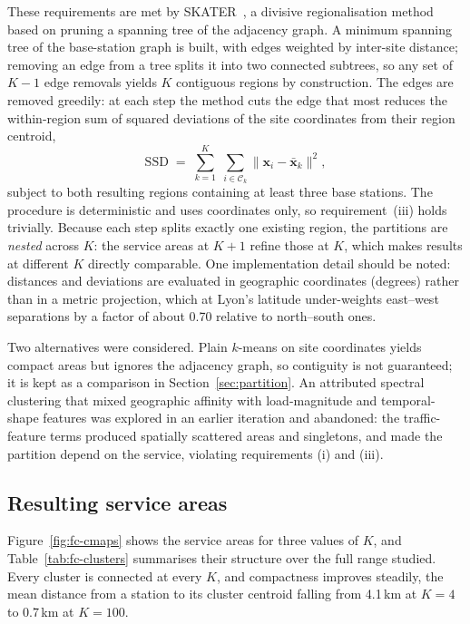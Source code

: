 These requirements are met by SKATER~\cite{assuncao2006skater}, a divisive regionalisation method
based on pruning a spanning tree of the adjacency graph. A minimum spanning tree of the base-station graph is built, with edges weighted by inter-site
distance; removing an edge from a tree splits it into two connected subtrees, so any set of $K-1$
edge removals yields $K$ contiguous regions by construction. The edges are removed greedily: at each
step the method cuts the edge that most reduces the within-region sum of squared deviations of the
site coordinates from their region centroid,
\begin{equation}
  \mathrm{SSD} \;=\; \sum_{k=1}^{K}\;\sum_{i\in\mathcal{C}_k} \bigl\lVert \mathbf{x}_i-\bar{\mathbf{x}}_k \bigr\rVert^2 ,
\end{equation}
subject to both resulting regions containing at least three base stations. The procedure is
deterministic and uses coordinates only, so requirement~(iii) holds trivially. Because each step
splits exactly one existing region, the partitions are \emph{nested} across $K$: the service areas at
$K{+}1$ refine those at $K$, which makes results at different $K$ directly comparable. One
implementation detail should be noted: distances and deviations are evaluated in geographic
coordinates (degrees) rather than in a metric projection, which at Lyon's latitude under-weights
east--west separations by a factor of about 0.70 relative to north--south ones.

Two alternatives were considered. Plain $k$-means on site coordinates yields compact areas but
ignores the adjacency graph, so contiguity is not guaranteed; it is kept as a comparison in
Section~\ref{sec:partition}. An attributed spectral clustering that mixed geographic affinity with
load-magnitude and temporal-shape features was explored in an earlier iteration and abandoned: the
traffic-feature terms produced spatially scattered areas and singletons, and made the partition depend
on the service, violating requirements (i) and (iii).

\subsection{Resulting service areas}

Figure~\ref{fig:fc-cmaps} shows the service areas for three values of $K$, and
Table~\ref{tab:fc-clusters} summarises their structure over the full range studied. Every cluster is
connected at every $K$, and compactness improves steadily, the mean distance from a station to its
cluster centroid falling from 4.1\,km at $K{=}4$ to 0.7\,km at $K{=}100$.


